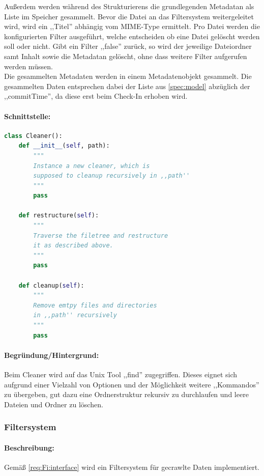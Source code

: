 Außerdem werden während des Strukturierens die grundlegenden Metadatan als Liste im Speicher gesammelt.
Bevor die Datei an das Filtersystem weitergeleitet wird, wird ein ,,Titel'' abhängig vom MIME-Type ermittelt.
Pro Datei werden die konfigurierten Filter ausgeführt, welche entscheiden ob eine Datei gelöscht werden soll oder nicht.
Gibt ein Filter ,,false'' zurück, so wird der jeweilige Dateiordner samt Inhalt sowie die Metadatan gelöscht,
ohne dass weitere Filter aufgerufen werden müssen.
\\
Die gesammelten Metadaten werden in einem Metadatenobjekt gesammelt. Die gesammelten Daten entsprechen dabei 
der Liste aus \ref{spec:model} abzüglich der ,,commitTime'', da diese erst beim Check-In erhoben wird.

\paragraph{Schnittstelle:} 
\label{par:schnittstelle_}
\begin{lstlisting}[language=python]
class Cleaner():
    def __init__(self, path):
        """
        Instance a new cleaner, which is
        supposed to cleanup recursively in ,,path''
        """
        pass

    def restructure(self): 
        """
        Traverse the filetree and restructure
        it as described above.
        """
        pass
  
    def cleanup(self):
        """
        Remove emtpy files and directories
        in ,,path'' recursively
        """
        pass
\end{lstlisting}

\paragraph{Begründung/Hintergrund:}
\label{par:hintergrund_}
Beim Cleaner wird auf das Unix Tool ,,find'' zugegriffen. Dieses eignet sich aufgrund einer Vielzahl
von Optionen und der Möglichkeit weitere ,,Kommandos'' zu übergeben, gut dazu eine Ordnerstruktur rekursiv
zu durchlaufen und leere Dateien und Ordner zu löschen.


\subsubsection{Filtersystem}
\label{ssub:filtersystem}
\paragraph{Beschreibung:}
\label{par:beschreibung_}
Gemäß \ref{req:Fi:interface} wird ein Filtersystem für gecrawlte Daten
implementiert.


